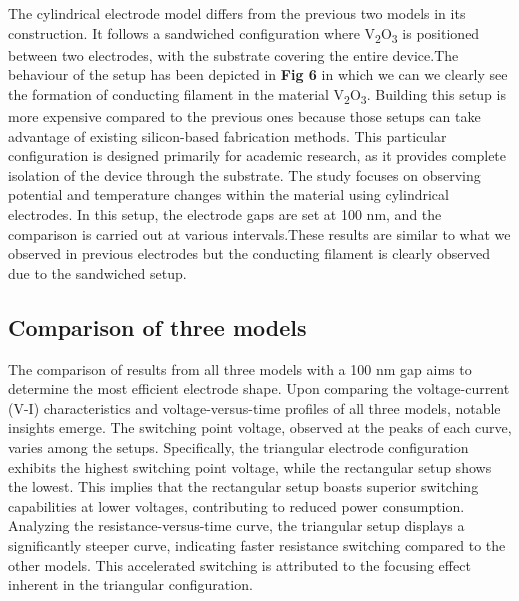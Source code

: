 \documentclass[conference]{IEEEtran}
\begin{document}
The cylindrical electrode model differs from the previous two models in its construction. It follows a sandwiched configuration where V\textsubscript{2}O\textsubscript{3} is positioned between two electrodes, with the substrate covering the entire device.The behaviour of the setup has been depicted in \textbf{Fig 6} in which we can we clearly see the formation of conducting filament in the material V\textsubscript{2}O\textsubscript{3}. Building this setup is more expensive compared to the previous ones because those setups can take advantage of existing silicon-based fabrication methods. This particular configuration is designed primarily for academic research, as it provides complete isolation of the device through the substrate. The study focuses on observing potential and temperature changes within the material using cylindrical electrodes. In this setup, the electrode gaps are set at 100 nm, and the comparison is carried out at various intervals.These results are similar to what we observed in previous electrodes but the conducting filament is clearly observed due to the sandwiched setup.




\subsection{Comparison of three models}

The comparison of results from all three models with a 100 nm gap aims to determine the most efficient electrode shape. Upon comparing the voltage-current (V-I) characteristics and voltage-versus-time profiles of all three models, notable insights emerge. The switching point voltage, observed at the peaks of each curve, varies among the setups. Specifically, the triangular electrode configuration exhibits the highest switching point voltage, while the rectangular setup shows the lowest. This implies that the rectangular setup boasts superior switching capabilities at lower voltages, contributing to reduced power consumption. Analyzing the resistance-versus-time curve, the triangular setup displays a significantly steeper curve, indicating faster resistance switching compared to the other models. This accelerated switching is attributed to the focusing effect inherent in the triangular configuration.
\end{document}
